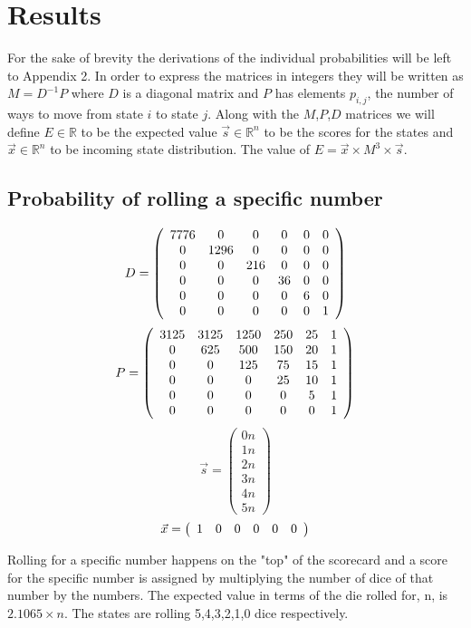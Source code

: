 \section{Results}

For the sake of brevity the derivations of the individual probabilities will be
left to Appendix 2. In order to express the matrices in integers they will be
 written as $M=D^{-1}P$ where $D$ is a diagonal matrix and $P$ has elements
 $p_{i,j}$, the number of ways to move from state $i$ to state $j$. Along with
 the $M$,$P$,$D$ matrices we will define $E \in \mathbb{R}$ to be the expected
 value $\vec{s} \in \mathbb{R}^n$ to be the scores for the states and
 $\vec{x} \in \mathbb{R}^n$ to be incoming state distribution. The value of
 $E=\vec{x} \times M^3 \times \vec{s}$.

\subsection{Probability of rolling a specific number}
\[
D=
\left(
\begin{array}{c c c c c c}
7776 &0&0&0&0&0\\
0 & 1296&0&0&0&0\\
0 &0&216&0&0&0\\
0 &0&0&36&0&0\\
0 &0&0&0&6&0\\
0&0&0&0&0&1
\end{array}
\right)
\]
\[
P=
\left(
\begin{array}{c c c c c c}
3125 & 3125 & 1250 & 250 & 25 & 1\\
0 & 625 & 500 & 150 & 20 & 1\\
0 & 0 & 125 & 75 & 15 & 1\\
0 & 0 & 0 & 25 & 10 & 1\\
0 & 0 & 0 & 0 & 5 & 1\\
0 & 0 & 0 & 0 & 0 & 1
\end{array}
\right)
\]
\[
\vec{s}=
\left(
\begin{array}{c}
0n\\
1n\\
2n\\
3n\\
4n\\
5n
\end{array}
\right)
\]
\[
\vec{x}=
\left(
\begin{array}{c c c c c c}
1&0&0&0&0&0
\end{array}
\right)
\]

Rolling for a specific number happens on the "top" of the scorecard and a score
for the specific number is assigned by multiplying the number of dice of that
number by the numbers. The expected value in terms of the die rolled for, n,
is $2.1065 \times n$. The states are rolling 5,4,3,2,1,0 dice respectively.

